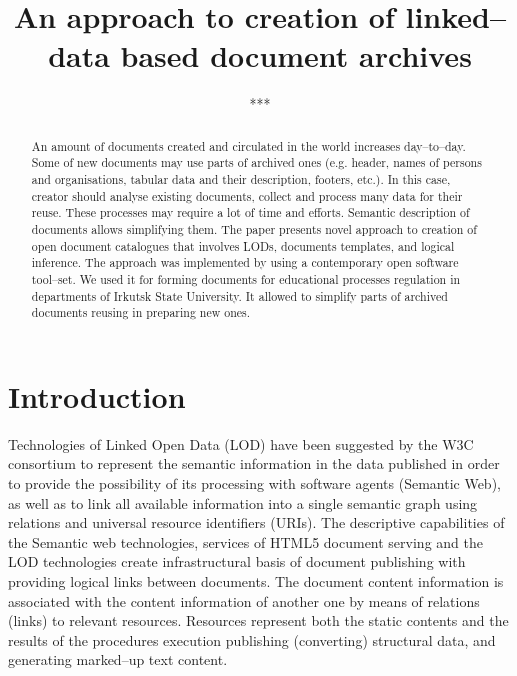 \documentclass[12pt]{llncs}
\begin{document}
\title{An approach to creation of linked--data based document archives}
%
%

\author{***}
%
\authorrunning{***}
%
\institute{***}

%
\maketitle              %
%
\begin{abstract}
An amount of documents created and circulated in the world increases day--to--day. Some of new documents may use parts of archived ones (e.g. header, names of persons and organisations, tabular data and their description, footers, etc.). In this case, creator should analyse existing documents, collect and process many data for their reuse. These processes may require a lot of time and efforts. Semantic description of documents allows simplifying them. The paper presents novel approach to creation of open document catalogues that involves LODs, documents templates, and logical inference. The approach was implemented by using a contemporary open software tool--set. We used it for forming documents for educational processes regulation in departments of Irkutsk State University. It allowed to simplify parts of archived documents reusing in preparing new ones.


\end{abstract}


\section{Introduction}


Technologies of Linked Open Data (LOD) \cite{b1} have been suggested by
the W3C consortium to represent the semantic information in the data
published in order to provide the possibility of its processing with
software agents (Semantic Web), as well as to link all available
information into a single semantic graph using relations and universal
resource identifiers (URIs). The descriptive capabilities of the
Semantic web technologies, services of HTML5 document serving and the
LOD technologies create infrastructural basis of document publishing
with providing logical links between documents. The document content
information is associated with the content information of another one by
means of relations (links) to relevant resources. Resources represent
both the static contents and the results of the procedures execution
publishing (converting) structural data, and generating marked--up text
content.
\end{document}
